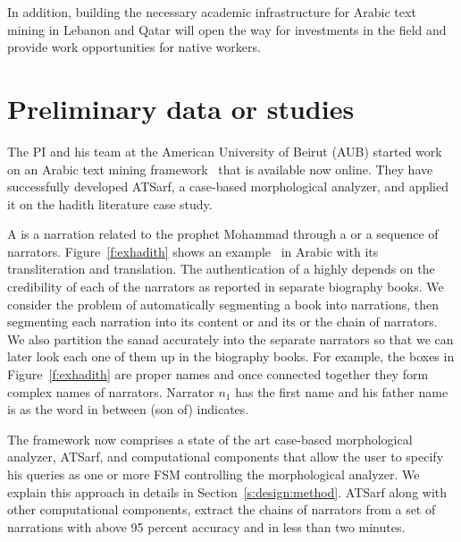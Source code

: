 \documentclass[12pt]{article}
\newcommand{\noArRL}[1]{\arabfalse\RL{#1}\arabtrue}
\newcommand{\noTrRL}[1]{\transfalse\RL{#1}\transtrue}
\begin{document}
In addition, building the necessary academic 
infrastructure for Arabic text mining in Lebanon and Qatar will 
open the way for investments in the field and provide work 
opportunities for native workers.

\pagebreak

\section{Preliminary data or studies}
\label{s:prelim}

\transfalse
\begin{figure}
\end{figure}
\transtrue

The PI and his team at the American University of Beirut (AUB)
started work on an Arabic text mining framework~\cite{ATMine09}
that is available now online.
They have successfully developed ATSarf, a case-based morphological 
analyzer, and applied it on the hadith literature case study. 

A  is a narration related to the prophet Mohammad
through a  or a sequence of narrators. 
Figure~\ref{f:exhadith} shows an example~\noArRL{.hady_t} in Arabic with its 
transliteration and translation. 
The authentication of a \noArRL{.hady_t} highly depends on the credibility
of each of the narrators as reported in separate biography 
books. 
We consider the problem of automatically segmenting
a \noArRL{.hady_t} book into narrations, then segmenting each 
narration into
its content or  and its \noArRL{sanad} or the
chain of narrators.
We also partition the sanad accurately into the 
separate narrators so that we can later look each one of them 
up in the biography books. 
For example, the boxes in Figure~\ref{f:exhadith} are proper names 
and once
connected together they form complex names of narrators. 
Narrator $n_1$ has the first name \noTrRL{qtybT} and his father 
name is \noTrRL{s`yd} as the word in between 
\noTrRL{bn} (son of) indicates. 


The framework now comprises a state of the art
case-based morphological analyzer, ATSarf, 
and computational components that allow the user to
specify his queries as one or more FSM
controlling the morphological analyzer.
We explain this approach in details in 
Section~\ref{s:design:method}.
ATSarf along with other computational components, 
extract the chains of narrators from a set of narrations
with above 95 percent accuracy and in less than two minutes. 
\end{document}
